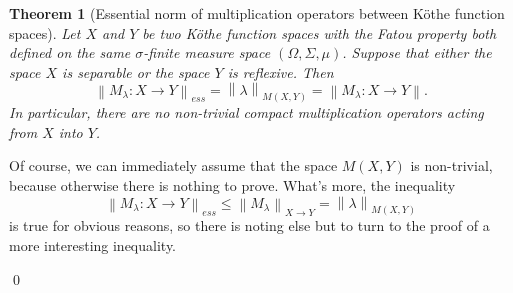 \documentclass[11pt]{amsart}
\theoremstyle{definition}
\newtheorem{theorem}{Theorem}[section]
\theoremstyle{definition}
\theoremstyle{definition}
\theoremstyle{definition}
\theoremstyle{definition}
\theoremstyle{definition}
\theoremstyle{definition}
\theoremstyle{definition}
\numberwithin{equation}{section}
\numberwithin{equation}{section}
\numberwithin{equation}{section}
\theoremstyle{definition}
\theoremstyle{definition}
\theoremstyle{definition}
\theoremstyle{definition}
\theoremstyle{definition}
\theoremstyle{definition}
\newcommand{\norm}[1]{\left\lVert#1\right\rVert}
\renewenvironment{proof}{\noindent {\bf Proof.}}{\qed}
\begin{document}
\begin{theorem}[Essential norm of multiplication operators between K{\" o}the function spaces] \label{THM: essnorm multipliers function}
	{\it Let $X$ and $Y$ be two K{\" o}the function spaces with the Fatou property both defined on the same $\sigma$-finite
		measure space $(\Omega,\Sigma,\mu)$. Suppose that either the space $X$ is separable or the space $Y$ is reflexive.
		Then
		\begin{equation*}
			\norm{M_{\lambda} \colon X \rightarrow Y}_{ess} = \norm{\lambda}_{M(X,Y)} = \norm{M_{\lambda} \colon X \rightarrow Y}.
		\end{equation*}
		In particular, there are no non-trivial compact multiplication operators acting from $X$ into $Y$.}
\end{theorem}
\begin{proof}
	Of course, we can immediately assume that the space $M(X,Y)$ is non-trivial, because otherwise there is nothing to prove. What's more,
	the inequality
	\begin{equation*}
		\norm{M_{\lambda} \colon X \rightarrow Y}_{ess} \leqslant \norm{M_{\lambda}}_{X \rightarrow Y} = \norm{\lambda}_{M(X,Y)}
	\end{equation*}
	is true for obvious reasons, so there is noting else but to turn to the proof of a more interesting inequality.
	

\end{proof}
\end{document}
